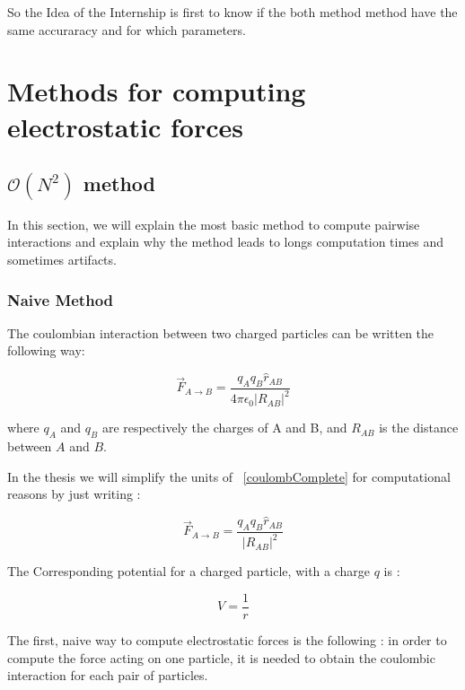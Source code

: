 \documentclass[11pt,twoside,a4paper]{report}
\begin{document}
So the Idea of the Internship is first to know if the both method method have the same accuraracy and for which parameters.


\chapter{Methods for computing electrostatic forces}


\section{$\mathcal{O}(N^2)$ method }


In this section, we will explain the most basic method to compute pairwise interactions and explain why the method leads to longs computation times and sometimes artifacts.

\subsection{Naive Method}

The coulombian interaction between two charged particles can be written the following way:

\begin{equation}
	\overrightarrow{F}_{A \rightarrow B} = \frac{q_A q_B \hat{r}_{AB} }{4\pi\epsilon_0|R_{AB}|^2}
	\label{coulombComplete}
\end{equation}

where $q_A $ and $q_B$ are respectively the charges of A and B, and $R_{AB}$ is the distance between $A$ and $B$.

In the thesis we will simplify the units of ~\eqref{coulombComplete} for computational reasons by just writing :

\begin{equation}
	\overrightarrow{F}_{A \rightarrow B} = \frac{q_A q_B \hat{r}_{AB} }{|R_{AB}|^2}
	\label{coulombSimplified}
\end{equation}

The Corresponding potential for a charged particle, with a charge $q$ is :

\begin{equation}
	V = \frac{1}{r}
	\label{potential}
\end{equation}



The first, naive way to compute electrostatic forces is the following : in order to compute the force acting on one particle, it is needed to obtain the coulombic interaction for each pair of particles.
\end{document}
